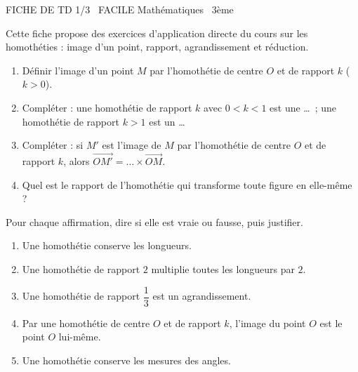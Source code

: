 \documentclass[11pt]{article}
\begin{document}
\begin{tcolorbox}[enhanced,colback=popink,colframe=popink,arc=10pt,boxrule=0pt,left=12pt,right=12pt,top=9pt,bottom=9pt]
{\color{white}\popxbold\small FICHE DE TD 1/3 \textbullet\ FACILE \hfill Mathématiques \textbullet\ 3ème\par}
\end{tcolorbox}
\vspace{4pt}
Cette fiche propose des exercices d'application directe du cours sur les homothéties : image d'un point, rapport, agrandissement et réduction.

\begin{exercice}
\begin{enumerate}
  \item Définir l'image d'un point $M$ par l'homothétie de centre $O$ et de rapport $k$ ($k>0$).
  \item Compléter : une homothétie de rapport $k$ avec $0<k<1$ est une \ldots\ ; une homothétie de rapport $k>1$ est un \ldots
  \item Compléter : si $M'$ est l'image de $M$ par l'homothétie de centre $O$ et de rapport $k$, alors $\overrightarrow{OM'} = \ldots \times \overrightarrow{OM}$.
  \item Quel est le rapport de l'homothétie qui transforme toute figure en elle-même ?
\end{enumerate}
\end{exercice}

\begin{exercice}
Pour chaque affirmation, dire si elle est vraie ou fausse, puis justifier.
\begin{enumerate}
  \item Une homothétie conserve les longueurs.
  \item Une homothétie de rapport $2$ multiplie toutes les longueurs par $2$.
  \item Une homothétie de rapport $\dfrac{1}{3}$ est un agrandissement.
  \item Par une homothétie de centre $O$ et de rapport $k$, l'image du point $O$ est le point $O$ lui-même.
  \item Une homothétie conserve les mesures des angles.
\end{enumerate}
\end{exercice}
\end{document}

